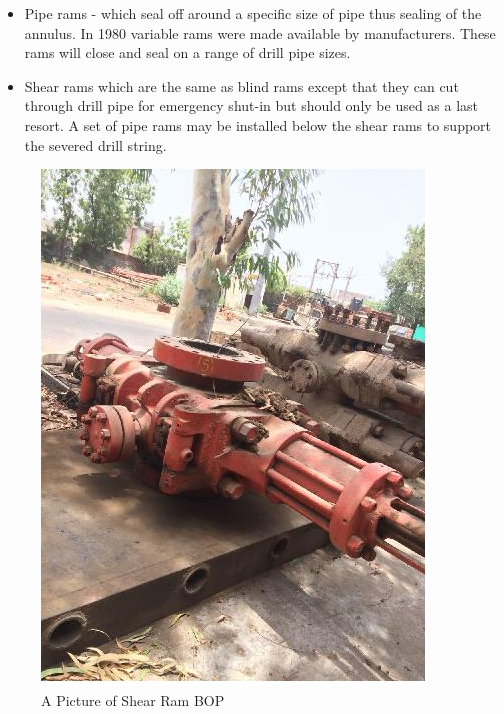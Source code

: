\begin{itemize}

\item Pipe rams - which seal off around a specific size of pipe thus
sealing of the annulus. In 1980 variable rams were made
available by manufacturers. These rams will close and seal on a
range of drill pipe sizes.

\vspace{1em}

\item Shear rams which are the same as blind rams except that they
can cut through drill pipe for emergency shut-in but should only
be used as a last resort. A set of pipe rams may be installed
below the shear rams to support the severed drill string.

\end{itemize}

\begin{figure}[h]
\includegraphics[scale=0.5]{images/shear_ram_BOP}
\centering 
\caption{A Picture of Shear Ram BOP}
\end{figure}







